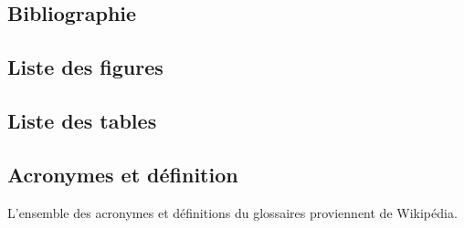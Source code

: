 \documentclass[12pt, a4paper, twoside]{article}
\begin{document}
\newpage
\subsection*{Bibliographie}
\nocite{*}
\printbibliography
\newpage
\subsection*{Liste des figures}
\listoffigures

\newpage
\subsection*{Liste des tables}
\listoftables

\newpage
\subsection*{Acronymes et définition}
L'ensemble des acronymes et définitions du glossaires proviennent de Wikipédia.
\glsaddall
\printglossaries
\end{document}
